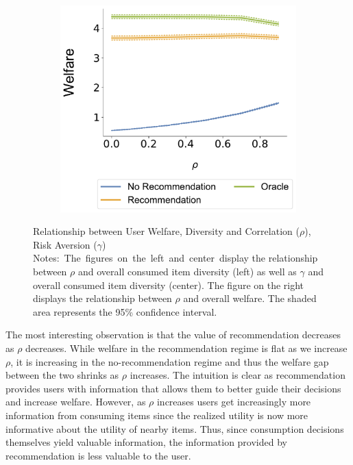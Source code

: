 \documentclass[sigconf]{acmart}
\begin{document}
\begin{figure}[t]
\begin{subfigure}{0.42\linewidth}
\end{subfigure}\\
\centering
\begin{subfigure}{0.42\linewidth}
  \includegraphics[width=1.0\linewidth]{figures/rho_welfare_N_200_T_20.pdf}
\end{subfigure}
\caption{Relationship between User Welfare, Diversity and Correlation ($\rho$), Risk Aversion ($\gamma$)\hfill\break
\scriptsize{Notes:~The~figures~on~the~left~and~center~display the relationship between $\rho$ and overall consumed item diversity (left) as well as $\gamma$ and overall consumed item diversity (center). The figure on the right displays the relationship between $\rho$ and overall welfare. The shaded area represents the 95\% confidence interval.}}
\label{fig:diversity_welfare_correlation}
\end{figure}


The most interesting observation is that the value of recommendation decreases as $\rho$ decreases. While welfare in the recommendation regime is flat as we increase $\rho$, it is increasing in the no-recommendation regime and thus the welfare gap between the two shrinks as $\rho$ increases. The intuition is clear as recommendation provides users with information that allows them to better guide their decisions and increase welfare. However, as $\rho$ increases users get increasingly more information from consuming items since the realized utility is now more informative about the utility of nearby items. Thus, since consumption decisions themselves yield valuable information, the information provided by recommendation is less valuable to the user.
\end{document}
